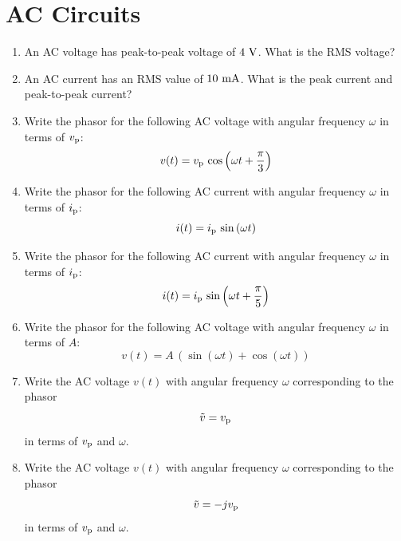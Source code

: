 \documentclass[12pt,oneside]{book}
\begin{document}
\section{AC Circuits}
\begin{enumerate}
\item An AC voltage has peak-to-peak voltage of $4~\rm V$.  What is the RMS voltage?

\item An AC current has an RMS value of $10~\rm mA$.  What is the peak current and peak-to-peak current?
\item Write the phasor for the following AC voltage with angular frequency $\omega$ in terms of $v_{\rm p}$:
\begin{displaymath}
v(t) = v_{\rm p} \, \cos \left(\omega t + \frac{\pi}{3} \right)
\end{displaymath}

\item Write the phasor for the following AC current with angular frequency $\omega$ in terms of $i_{\rm p}$:
\begin{displaymath}
i(t) = i_{\rm p} \, \sin \left(\omega t \right)
\end{displaymath}

\item Write the phasor for the following AC current with angular frequency $\omega$ in terms of $i_{\rm p}$:
\begin{displaymath}
i(t) = i_{\rm p} \, \sin \left(\omega t + \frac{\pi}{5}\right)
\end{displaymath}
 
\item Write the phasor for the following AC voltage with angular frequency $\omega$ in terms of $A$:
\begin{displaymath}
v(t) = A \, (\sin(\omega t) + \cos (\omega t))
\end{displaymath}

\item Write the AC voltage $v(t)$ with angular frequency $\omega$ corresponding to the phasor
\begin{displaymath}
\tilde{v} = v_{\rm p}
\end{displaymath}
in terms of $v_{\rm p}$ and $\omega$.

 \item Write the AC voltage $v(t)$ with angular frequency $\omega$ corresponding to the phasor
\begin{displaymath}
\tilde{v} = - j v_{\rm p}
\end{displaymath}
in terms of $v_{\rm p}$ and $\omega$.


\end{enumerate}
\end{document}
